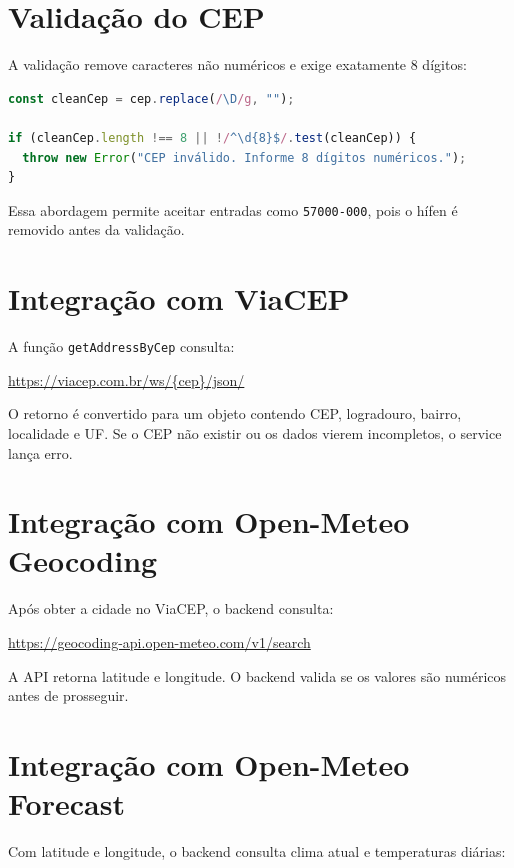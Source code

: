 \documentclass[
    12pt,
    oneside,
    openright,
    a4paper,
    english,
    brazil
]{abntex2}
\begin{document}
\section{Validação do CEP}

A validação remove caracteres não numéricos e exige exatamente 8 dígitos:

\begin{lstlisting}[language=JavaScript, caption={Validação do CEP}]
const cleanCep = cep.replace(/\D/g, "");

if (cleanCep.length !== 8 || !/^\d{8}$/.test(cleanCep)) {
  throw new Error("CEP inválido. Informe 8 dígitos numéricos.");
}
\end{lstlisting}

Essa abordagem permite aceitar entradas como \texttt{57000-000}, pois o hífen é removido antes da validação.

\section{Integração com ViaCEP}

A função \texttt{getAddressByCep} consulta:

\begin{center}
\url{https://viacep.com.br/ws/{cep}/json/}
\end{center}

O retorno é convertido para um objeto contendo CEP, logradouro, bairro, localidade e UF. Se o CEP não existir ou os dados vierem incompletos, o service lança erro.

\section{Integração com Open-Meteo Geocoding}

Após obter a cidade no ViaCEP, o backend consulta:

\begin{center}
\url{https://geocoding-api.open-meteo.com/v1/search}
\end{center}

A API retorna latitude e longitude. O backend valida se os valores são numéricos antes de prosseguir.

\section{Integração com Open-Meteo Forecast}

Com latitude e longitude, o backend consulta clima atual e temperaturas diárias:
\end{document}
